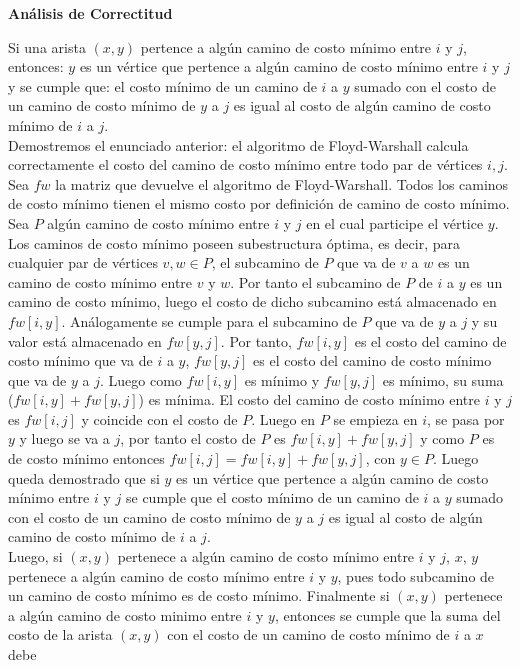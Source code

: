 \documentclass[
10pt, %
a4paper, %
oneside, %
headinclude,footinclude, %
BCOR5mm, %
]{scrartcl}
\begin{document}
\textbf{Análisis de Correctitud}

Si una arista $(x, y)$ pertence a algún camino de costo mínimo entre $i$ y $j$,
entonces: $y$ es un vértice que pertence a algún camino de costo mínimo entre $i$ y
$j$ y se cumple que: el costo mínimo de un camino de $i$ a $y$ sumado con el costo de
un camino de costo mínimo de $y$ a $j$ es igual al costo de algún camino de costo
mínimo de $i$ a $j$.\\
Demostremos el enunciado anterior: el algoritmo de Floyd-Warshall calcula correctamente el costo del camino de
costo mínimo entre todo par de vértices $i, j$. Sea $fw$ la matriz que devuelve el
algoritmo de Floyd-Warshall. Todos los caminos de costo mínimo tienen el mismo
costo por definición de camino de costo mínimo. Sea $P$ algún camino de costo
mínimo entre $i$ y $j$ en el cual participe el vértice $y$. Los caminos de costo mínimo
poseen subestructura óptima, es decir, para cualquier par de vértices $v, w \in P$,
el subcamino de $P$ que va de $v$ a $w$ es un camino de costo mínimo entre $v$ y $w$.
Por tanto el subcamino de $P$ de $i$ a $y$ es un camino de costo mínimo, luego el
costo de dicho subcamino está almacenado en $fw[i, y]$. Análogamente se cumple
para el subcamino de $P$ que va de $y$ a $j$ y su valor está almacenado en $fw[y, j]$.
Por tanto, $fw[i, y]$ es el costo del camino de costo mínimo que va de $i$ a $y$, $fw[y, j]$
es el costo del camino de costo mínimo que va de $y$ a $j$. Luego como $fw[i, y]$ es
mínimo y $fw[y, j]$ es mínimo, su suma ($fw[i, y] + fw[y, j]$) es
mínima. El costo del camino de costo mínimo entre $i$ y $j$ es $fw[i, j]$ y coincide
con el costo de $P$. Luego en $P$ se empieza en $i$, se pasa por $y$ y luego se va a
$j$, por tanto el costo de $P$ es $fw[i, y] + fw[y, j]$ y como $P$ es de costo mínimo
entonces $fw[i, j] = fw[i, y] + fw[y, j]$, con $y \in P$. Luego queda demostrado que
si $y$ es un vértice que pertence a algún camino de costo mínimo entre $i$ y $j$ se
cumple que el costo mínimo de un camino de $i$ a $y$ sumado con el costo de un
camino de costo mínimo de $y$ a $j$ es igual al costo de algún camino de costo
mínimo de $i$ a $j$.\\
Luego, si $(x, y)$ pertenece a algún camino de costo mínimo entre $i$ y $j$, $x$, $y$
pertenece a algún camino de costo mínimo entre $i$ y $y$, pues todo subcamino de
un camino de costo mínimo es de costo mínimo. Finalmente si $(x, y)$ pertenece
a algún camino de costo minimo entre $i$ y $y$, entonces se cumple que la suma del
costo de la arista $(x, y)$ con el costo de un camino de costo mínimo de $i$ a $x$ debe
\end{document}
